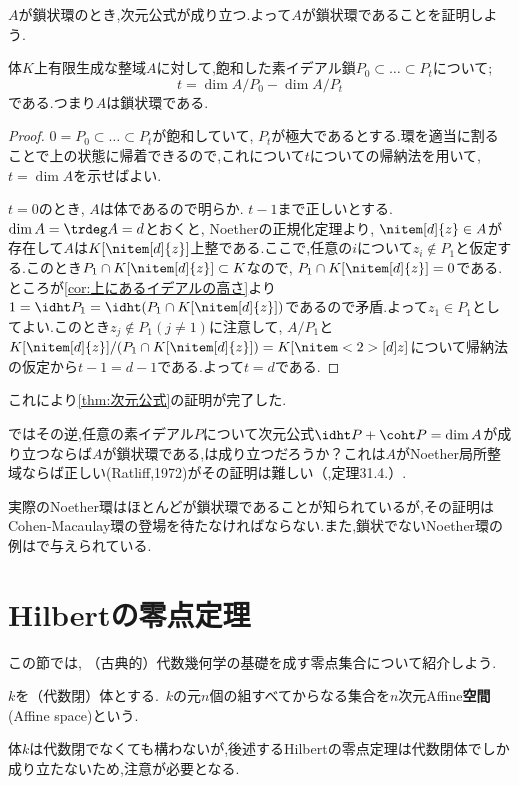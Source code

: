$A$が鎖状環のとき,次元公式が成り立つ.よって$A$が鎖状環であることを証明しよう.

\begin{thm}
	体$K$上有限生成な整域$A$に対して,飽和した素イデアル鎖$P_0\subset\dots\subset P_t$について;
	\[t=\dim A/P_0-\dim A/P_t\]
	である.つまり$A$は鎖状環である.
\end{thm}

\begin{proof}
		$0=P_0\subset\dots\subset P_t$が飽和していて, $P_t$が極大であるとする.環を適当に割ることで上の状態に帰着できるので,これについて$t$についての帰納法を用いて, $t=\dim A$を示せばよい.
		
		$t=0$のとき, $A$は体であるので明らか. $t-1$まで正しいとする. $\dim A=\trdeg A=d$とおくと, Noetherの正規化定理より, $\nitem[d]{z}\in A$が存在して$A$は$K[\nitem[d]{z}]$上整である.ここで,任意の$i$について$z_i\not\in P_1$と仮定する.このとき$P_1\cap K[\nitem[d]{z}]\subset K$なので, $P_1\cap K[\nitem[d]{z}]=0$である.ところが\ref{cor:上にあるイデアルの高さ}より$1=\idht P_1=\idht (P_1\cap K[\nitem[d]{z}])$であるので矛盾.よって$z_1\in P_1$としてよい.このとき$z_j\not\in P_1 (j\neq1)$に注意して, $A/P_1$と$K[\nitem[d]{z}]/(P_1\cap K[\nitem[d]{z}])=K[\nitem<2>[d]{z}]$について帰納法の仮定から$t-1=d-1$である.よって$t=d$である.
\end{proof}

これにより\ref{thm:次元公式}の証明が完了した.

ではその逆,任意の素イデアル$P$について次元公式$\idht P +\coht P =\dim A$が成り立つならば$A$が鎖状環である,は成り立つだろうか？これは$A$がNoether局所整域ならば正しい(Ratliff,1972)がその証明は難しい（\cite{matsu},定理31.4.）.

実際のNoether環はほとんどが鎖状環であることが知られているが,その証明はCohen-Macaulay環の登場を待たなければならない.また,鎖状でないNoether環の例は\cite{Nag73}で与えられている.
\section{Hilbertの零点定理}

この節では, （古典的）代数幾何学の基礎を成す零点集合について紹介しよう.
	
\begin{defi}[Affine-$n$空間]
	$k$を（代数閉）体とする.~$k$の元$n$個の組すべてからなる集合を$n$次元Affine\textbf{空間}(Affine space)という.
\end{defi}

体$k$は代数閉でなくても構わないが,後述するHilbertの零点定理は代数閉体でしか成り立たないため,注意が必要となる.

